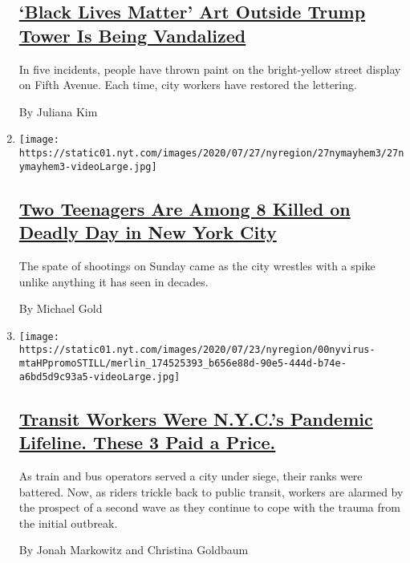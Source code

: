 \begin{enumerate}
{  \subsection{\texorpdfstring{\href{/2020/07/28/nyregion/blm-trump-tower.html}{`Black
  Lives Matter' Art Outside Trump Tower Is Being
  Vandalized}}{`Black Lives Matter' Art Outside Trump Tower Is Being Vandalized}}\label{black-lives-matter-art-outside-trump-tower-is-being-vandalized}}

  In five incidents, people have thrown paint on the bright-yellow
  street display on Fifth Avenue. Each time, city workers have restored
  the lettering.

  By Juliana Kim
\item
  \texttt{[image: https://static01.nyt.com/images/2020/07/27/nyregion/27nymayhem3/27nymayhem3-videoLarge.jpg]}

  \hypertarget{two-teenagers-are-among-8-killed-on-deadly-day-in-new-york-city}{%
  \subsection{\texorpdfstring{\href{/2020/07/27/nyregion/nyc-shootings-weekend.html}{Two
  Teenagers Are Among 8 Killed on Deadly Day in New York
  City}}{Two Teenagers Are Among 8 Killed on Deadly Day in New York City}}\label{two-teenagers-are-among-8-killed-on-deadly-day-in-new-york-city}}

  The spate of shootings on Sunday came as the city wrestles with a
  spike unlike anything it has seen in decades.

  By Michael Gold
\item
  \texttt{[image: https://static01.nyt.com/images/2020/07/23/nyregion/00nyvirus-mtaHPpromoSTILL/merlin\_174525393\_b656e88d-90e5-444d-b74e-a6bd5d9c93a5-videoLarge.jpg]}

  \hypertarget{transit-workers-were-nycs-pandemic-lifeline-these-3-paid-a-price}{%
  \subsection{\texorpdfstring{\href{/interactive/2020/07/26/nyregion/nyc-covid-19-mta-transit-workers.html}{Transit
  Workers Were N.Y.C.'s Pandemic Lifeline. These 3 Paid a
  Price.}}{Transit Workers Were N.Y.C.'s Pandemic Lifeline. These 3 Paid a Price.}}\label{transit-workers-were-nycs-pandemic-lifeline-these-3-paid-a-price}}

  As train and bus operators served a city under siege, their ranks were
  battered. Now, as riders trickle back to public transit, workers are
  alarmed by the prospect of a second wave as they continue to cope with
  the trauma from the initial outbreak.

  By Jonah Markowitz and Christina Goldbaum
\end{enumerate}

